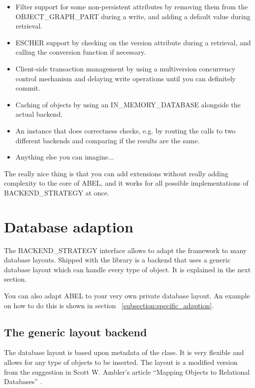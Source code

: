 \begin{itemize}
 \item Filter support for some non-persistent attributes by removing them from the OBJECT\_GRAPH\_PART during a write, and adding a default value during retrieval.
 \item ESCHER support by checking on the version attribute during a retrieval, and calling the conversion function if necessary.
 \item Client-side transaction management by using a multiversion concurrency control mechanism and delaying write operations until you can definitely commit.
 \item Caching of objects by using an IN\_MEMORY\_DATABASE alongside the actual backend.
 \item An instance that does correctness checks, e.g. by routing the calls to two different backends and comparing if the results are the same.
 \item Anything else you can imagine...
\end{itemize}

The really nice thing is that you can add extensions without really adding complexity to the core of ABEL, and it works for all possible implementations of BACKEND\_STRATEGY at once.


\section{Database adaption}

The BACKEND\_STRATEGY interface allows to adapt the framework to many database layouts.
Shipped with the library is a backend that uses a generic database layout which can handle every type of object.
It is explained in the next section.

You can also adapt ABEL to your very own private database layout.
An example on how to do this is shown in section ~\ref{subsection:specific_adaption}.

\subsection{The generic layout backend}

The database layout is based upon metadata of the class. 
It is very flexible and allows for any type of objects to be inserted.
The layout is a modified version from the suggestion in Scott W. Ambler's article ``Mapping Objects to Relational Databases'' .


